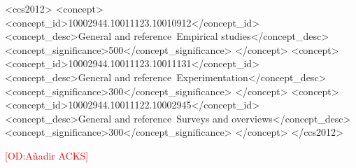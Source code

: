\documentclass[acmtosem, screen, review]{acmart}
\newcommand{\odnote}[1]{\textcolor{red}{[OD:#1]}}
\begin{document}
\begin{CCSXML}
<ccs2012>
   <concept>
       <concept_id>10002944.10011123.10010912</concept_id>
       <concept_desc>General and reference~Empirical studies</concept_desc>
       <concept_significance>500</concept_significance>
       </concept>
   <concept>
       <concept_id>10002944.10011123.10011131</concept_id>
       <concept_desc>General and reference~Experimentation</concept_desc>
       <concept_significance>300</concept_significance>
       </concept>
   <concept>
       <concept_id>10002944.10011122.10002945</concept_id>
       <concept_desc>General and reference~Surveys and overviews</concept_desc>
       <concept_significance>300</concept_significance>
       </concept>
 </ccs2012>
\end{CCSXML}



\received[revised]{}
\received[accepted]{}

\maketitle





















\begin{acks}
  \odnote{A\~nadir ACKS}
\end{acks}




\end{document}
